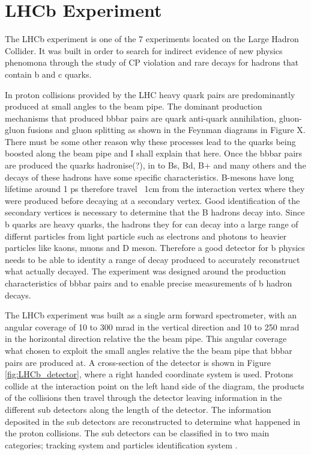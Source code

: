 \section{LHCb Experiment}

The LHCb experiment is one of the 7 experiments located on the Large Hadron Collider. It was built in order to search for indirect evidence of new physics phenomona through the study of CP violation and rare decays for hadrons that contain b and c quarks.

In proton collisions provided by the LHC heavy quark pairs are predominantly produced at small angles to the beam pipe. The dominant production mechanisms that produced bbbar pairs are quark anti-quark annihilation, gluon-gluon fusions and  gluon splitting as shown in the Feynman diagrams in Figure X. There must be some other reason why these processes lead to the quarks being boosted along the beam pipe and I shall explain that here. Once the bbbar pairs are produced the quarks hadronise(?), in to Bs, Bd, B+ and many others and the decays of these hadrons have some specific characteristics. B-mesons have long lifetime around 1 ps therefore travel ~1cm from the interaction vertex where they were produced before decaying at a secondary vertex. Good identification of the secondary vertices is necessary to determine that the B hadrons decay into. Since b quarks are heavy quarks, the hadrons they for can decay into a large range of differnt particles from light particle such as electrons and photons to heavier particles like kaons, muons and D meson. Therefore a good detector for b physics needs to be able to identity a range of decay produced to accurately reconstruct what actually decayed. The experiment was designed around the production characteristics of bbbar pairs and to enable precise measurements of b hadron decays. 

The LHCb experiment was built as a single arm forward spectrometer, with an angular coverage of 10 to 300 mrad in the vertical direction and 10 to 250 mrad in the horizontal direction relative the the beam pipe. This angular coverage what chosen to exploit the small angles relative the the beam pipe that bbbar pairs are produced at. A cross-section of the detector is shown in Figure \ref{fig:LHCb_detector}, where a right handed coordinate system is used. Protons collide at the interaction point on the left hand side of the diagram, the products of the collisions then travel through the detector leaving information in the different sub detectors along the length of the detector. The information deposited in the sub detectors are reconstructed to determine what happened in the proton collisions. The sub detectors can be classified in to two main categories; tracking system and particles identification system .


